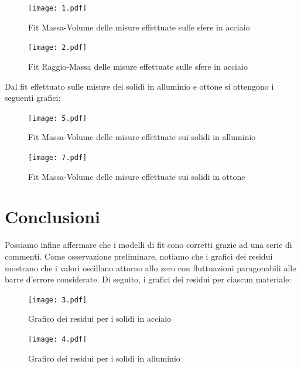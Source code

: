 \documentclass{article}
\begin{document}
\begin{figure}
    \centering
    \texttt{[image: 1.pdf]}
    \caption{Fit Massa-Volume delle misure effettuate sulle sfere in acciaio}
    \label{fig:my_label}
\end{figure}

\begin{figure}
    \centering
    \texttt{[image: 2.pdf]}
    \caption{Fit Raggio-Massa delle misure effettuate sulle sfere in acciaio}
    \label{fig:my_label}
\end{figure}

\FloatBarrier

Dal fit effettuato sulle misure dei solidi in alluminio e ottone si ottengono i seguenti grafici:
\begin{figure} [h]
    \centering
    \texttt{[image: 5.pdf]}
    \caption{Fit Massa-Volume delle misure effettuate sui solidi in alluminio}
    \label{fig:my_label}
\end{figure}

\FloatBarrier

\begin{figure} [h]
    \centering
    \texttt{[image: 7.pdf]}
    \caption{Fit Massa-Volume delle misure effettuate sui solidi in ottone}
    \label{fig:my_label}
\end{figure}

\FloatBarrier

\vspace{1em}

\section{Conclusioni} 
Possiamo infine affermare che i modelli di fit sono corretti grazie ad una serie di commenti. Come osservazione preliminare, notiamo che i grafici dei residui mostrano che i valori oscillano attorno allo zero con fluttuazioni paragonabili alle barre d'errore considerate. Di seguito, i grafici dei residui per ciascun materiale:


\begin{figure}
    \centering
    \texttt{[image: 3.pdf]}
    \caption{Grafico dei residui per i solidi in acciaio}
    \label{fig:my_label}
\end{figure}

\begin{figure}
    \centering
    \texttt{[image: 4.pdf]}
    \caption{Grafico dei residui per i solidi in alluminio}
    \label{fig:my_label}
\end{figure}
\end{document}
